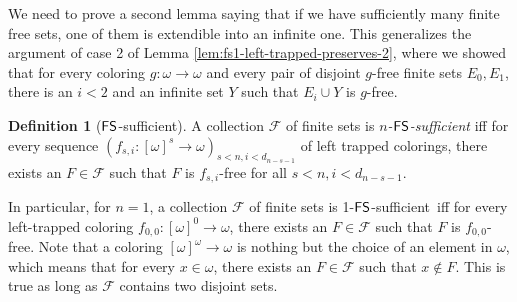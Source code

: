 \documentclass{amsart}
\theoremstyle{definition}
\newtheorem{definition}[theorem]{Definition}
\theoremstyle{remark}
\numberwithin{equation}{section}
\theoremstyle{noparens}
\def\mcal{\mathcal}
\newcommand{\s}[1]{\ensuremath{\sf{#1}}}
\DeclareMathOperator{\fs}{\s{FS}}
\def\fssufficient{$\fs$-sufficient}
\begin{document}
We need to prove a second lemma saying that if we have sufficiently many finite free sets,
one of them is extendible into an infinite one.
This generalizes the argument of case 2 of Lemma
\ref{lem:fs1-left-trapped-preserves-2}, where we showed that
for every coloring $g:\omega\rightarrow \omega$ and every pair of disjoint $g$-free finite sets $E_0, E_1$,
 there is an $i<2$ and an infinite set $Y$ such that $E_i\cup Y$ is $g$-free.
\begin{definition}[\fssufficient]
\label{def:fssuff}
A collection $\mcal{F}$ of finite sets is \emph{$n$-\fssufficient} iff for every sequence $(f_{s,i}:[\omega]^s\rightarrow\omega)_{s< n,i<d_{n-s-1}}$
of left trapped colorings, there exists an $F\in\mcal{F}$ such that
$F$ is $f_{s,i}$-free for all $s< n,i<d_{n-s-1}$.
\end{definition}

In particular, for $n = 1$, a collection $\mcal{F}$ of finite sets is 1-\fssufficient\ iff for every left-trapped coloring $f_{0,0} : [\omega]^0 \to \omega$, there exists an $F \in \mcal{F}$ such that $F$ is $f_{0,0}$-free. Note that a coloring $[\omega]^\omega \to \omega$ is nothing but the choice of an element in $\omega$, which means that for every $x \in \omega$, there exists an $F \in \mcal{F}$ such that $x \not \in F$. This is true as long as $\mcal{F}$ contains two disjoint sets.
\end{document}
